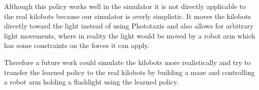 \documentclass[twoside]{article}
\begin{document}
Although this policy works well in the simulator it is not directly applicable
to the real kilobots because our simulator is overly simplistic. It moves
the kilobots directly toward the light instead of using Phototaxis and also
allows for arbitrary light movements, where in reality the light would be moved
by a robot arm which has some constraints on the forces it can apply.

Therefore a future work could simulate the kilobots more realistically and try
to transfer the learned policy to the real kilobots by building a maze and
controlling a robot arm holding a flashlight using the learned policy.



\end{document}

